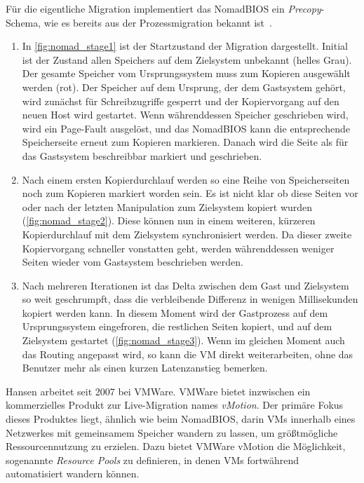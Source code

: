 Für die eigentliche Migration implementiert das NomadBIOS ein
\emph{Precopy}-Schema, wie es bereits aus der Prozessmigration bekannt
ist~\cite{hansen2002nomadic}.
\begin{enumerate}
\item In \autoref{fig:nomad_stage1} ist der Startzustand der
  Migration dargestellt. Initial ist der Zustand allen Speichers auf
  dem Zielsystem unbekannt (helles Grau). Der gesamte Speicher vom
  Ursprungssystem muss zum Kopieren ausgewählt werden (rot). Der
  Speicher auf dem Ursprung, der dem Gastsystem gehört, wird zunächst
  für Schreibzugriffe gesperrt und der Kopiervorgang auf den neuen
  Host wird gestartet. Wenn währenddessen Speicher geschrieben wird,
  wird ein Page-Fault ausgelöst, und das NomadBIOS kann die
  entsprechende Speicherseite erneut zum Kopieren markieren. Danach
  wird die Seite als für das Gastsystem beschreibbar markiert und
  geschrieben.
\item Nach einem ersten Kopierdurchlauf werden so eine Reihe von
  Speicherseiten noch zum Kopieren markiert worden sein. Es ist nicht
  klar ob diese Seiten vor oder nach der letzten Manipulation zum
  Zielsystem kopiert wurden (\autoref{fig:nomad_stage2}). Diese
  können nun in einem weiteren, kürzeren Kopierdurchlauf mit dem
  Zielsystem synchronisiert werden. Da dieser zweite Kopiervorgang
  schneller vonstatten geht, werden währenddessen weniger Seiten
  wieder vom Gastsystem beschrieben werden.
\item Nach mehreren Iterationen ist das Delta zwischen dem Gast und
  Zielsystem so weit geschrumpft, dass die verbleibende Differenz in
  wenigen Millisekunden kopiert werden kann. In diesem Moment wird der
  Gastprozess auf dem Ursprungssystem eingefroren, die restlichen
  Seiten kopiert, und auf dem Zielsystem gestartet
  (\autoref{fig:nomad_stage3}). Wenn im gleichen Moment auch das
  Routing angepasst wird, so kann die \ac{VM} direkt weiterarbeiten, ohne
  das Benutzer mehr als einen kurzen Latenzanstieg bemerken.
\end{enumerate}


Hansen arbeitet seit 2007 bei VMWare. VMWare bietet inzwischen ein
kommerzielles Produkt zur Live-Migration names \emph{vMotion}. Der
primäre Fokus dieses Produktes liegt, ähnlich wie beim NomadBIOS,
darin \acp{VM} innerhalb eines Netzwerkes mit gemeinsamem Speicher
wandern zu lassen, um größtmögliche Ressourcennutzung zu
erzielen. Dazu bietet VMWare vMotion die Möglichkeit,
sogenannte \emph{Resource Pools} zu definieren, in denen \acp{VM}
fortwährend automatisiert wandern können.

